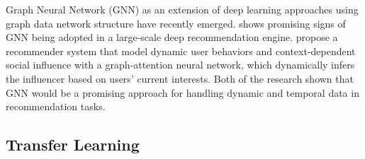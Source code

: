 Graph Neural Network (GNN) as an extension of deep learning approaches using graph data network structure have recently emerged. \citet{ying2018graph} shows promising signs of GNN being adopted in a large-scale deep recommendation engine. \citet{song2019session} propose a recommender system that model dynamic user behaviors and context-dependent social influence with a graph-attention neural network, which dynamically infers the influencer based on users’ current interests. Both of the research shown that GNN would be a promising approach for handling dynamic and temporal data in recommendation tasks.

\subsection{Transfer Learning}
